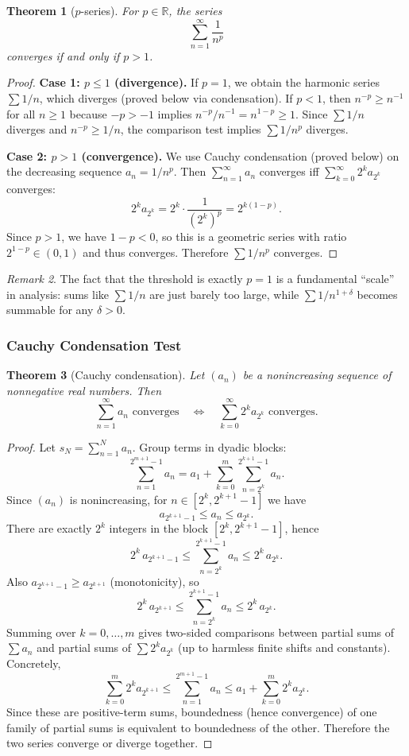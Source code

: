 \documentclass[12pt]{article}
\numberwithin{equation}{section}
\newcommand{\RR}{\mathbb{R}}
\theoremstyle{plain}
\newtheorem{theorem}{Theorem}[section]
\theoremstyle{definition}
\theoremstyle{remark}
\newtheorem{remark}[theorem]{Remark}
\begin{document}
\begin{theorem}[$p$-series]\label{thm:p-series}
For $p\in\RR$, the series
\[
\sum_{n=1}^{\infty}\frac{1}{n^p}
\]
converges if and only if $p>1$.
\end{theorem}

\begin{proof}
\textbf{Case 1: $p\le 1$ (divergence).}
If $p=1$, we obtain the harmonic series $\sum 1/n$, which diverges (proved below via condensation).
If $p<1$, then $n^{-p} \ge n^{-1}$ for all $n\ge 1$ because $-p>-1$ implies $n^{-p}/n^{-1}=n^{1-p}\ge 1$.
Since $\sum 1/n$ diverges and $n^{-p}\ge 1/n$, the comparison test implies $\sum 1/n^p$ diverges.

\textbf{Case 2: $p>1$ (convergence).}
We use Cauchy condensation (proved below) on the decreasing sequence $a_n=1/n^p$.
Then $\sum_{n=1}^{\infty} a_n$ converges iff $\sum_{k=0}^{\infty} 2^k a_{2^k}$ converges:
\[
2^k a_{2^k} = 2^k \cdot \frac{1}{(2^k)^p} = 2^{k(1-p)}.
\]
Since $p>1$, we have $1-p<0$, so this is a geometric series with ratio $2^{1-p}\in(0,1)$ and thus converges.
Therefore $\sum 1/n^p$ converges.
\end{proof}

\begin{remark}
The fact that the threshold is exactly $p=1$ is a fundamental “scale” in analysis: sums like $\sum 1/n$ are just barely too large, while $\sum 1/n^{1+\delta}$ becomes summable for any $\delta>0$.
\end{remark}

\subsubsection{Cauchy Condensation Test}

\begin{theorem}[Cauchy condensation]\label{thm:condensation}
Let $(a_n)$ be a nonincreasing sequence of nonnegative real numbers.
Then
\[
\sum_{n=1}^{\infty} a_n \text{ converges}
\quad\Longleftrightarrow\quad
\sum_{k=0}^{\infty} 2^k a_{2^k} \text{ converges}.
\]
\end{theorem}

\begin{proof}
Let $s_N=\sum_{n=1}^{N}a_n$. Group terms in dyadic blocks:
\[
\sum_{n=1}^{2^{m+1}-1} a_n
= a_1 + \sum_{k=0}^{m} \sum_{n=2^k}^{2^{k+1}-1} a_n.
\]
Since $(a_n)$ is nonincreasing, for $n\in[2^k,2^{k+1}-1]$ we have
\[
a_{2^{k+1}-1}\le a_n \le a_{2^k}.
\]
There are exactly $2^k$ integers in the block $[2^k,2^{k+1}-1]$, hence
\[
2^k\,a_{2^{k+1}-1}\le \sum_{n=2^k}^{2^{k+1}-1} a_n \le 2^k\,a_{2^k}.
\]
Also $a_{2^{k+1}-1}\ge a_{2^{k+1}}$ (monotonicity), so
\[
2^k\,a_{2^{k+1}} \le \sum_{n=2^k}^{2^{k+1}-1} a_n \le 2^k\,a_{2^k}.
\]
Summing over $k=0,\dots,m$ gives two-sided comparisons between partial sums of $\sum a_n$ and partial sums of $\sum 2^k a_{2^k}$ (up to harmless finite shifts and constants).
Concretely,
\[
\sum_{k=0}^{m} 2^k a_{2^{k+1}}
\le
\sum_{n=1}^{2^{m+1}-1} a_n
\le
a_1+\sum_{k=0}^{m} 2^k a_{2^k}.
\]
Since these are positive-term sums, boundedness (hence convergence) of one family of partial sums is equivalent to boundedness of the other.
Therefore the two series converge or diverge together.
\end{proof}
\end{document}
